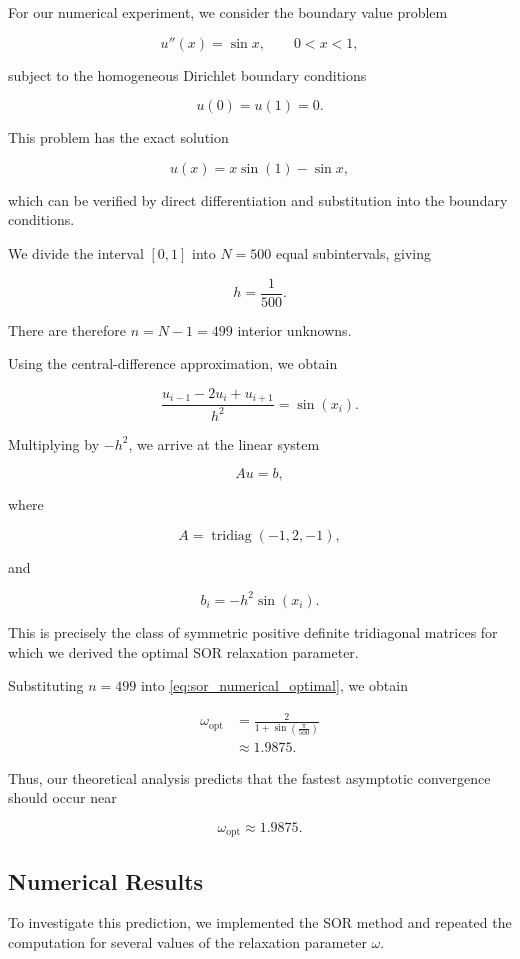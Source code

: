 \documentclass[11pt,a4paper]{article}
\theoremstyle{definition}
\theoremstyle{remark}
\begin{document}
For our numerical experiment, we consider
the boundary value problem

\[
    u''(x)=\sin x,
    \qquad 0<x<1,
\]

subject to the homogeneous Dirichlet
boundary conditions

\[
    u(0)=u(1)=0.
\]

This problem has the exact solution

\[
    u(x)=x\sin(1)-\sin x,
\]

which can be verified by direct
differentiation and substitution into
the boundary conditions.

We divide the interval $[0,1]$ into
$N=500$ equal subintervals, giving

\[
    h=\frac{1}{500}.
\]

There are therefore $n=N-1=499$
interior unknowns.

Using the central-difference
approximation, we obtain

\[
    \frac{
    u_{i-1}-2u_i+u_{i+1}
    }{h^2}
    =
    \sin(x_i).
\]

Multiplying by $-h^2$, we arrive at
the linear system

\[
    Au=b,
\]

where

\[
    A=\operatorname{tridiag}(-1,2,-1),
\]

and

\[
    b_i=-h^2\sin(x_i).
\]

This is precisely the class of symmetric
positive definite tridiagonal matrices
for which we derived the optimal SOR
relaxation parameter.

Substituting $n=499$ into
\eqref{eq:sor_numerical_optimal}, we obtain

\[
\begin{aligned}
    \omega_{\mathrm{opt}}
    &=
    \frac{2}{
    1+\sin\left(\frac{\pi}{500}\right)
    }\\[6pt]
    &\approx 1.9875.
\end{aligned}
\]

Thus, our theoretical analysis predicts
that the fastest asymptotic convergence
should occur near

\[
    \boxed{\omega_{\mathrm{opt}}\approx1.9875.}
\]

\subsection{Numerical Results}

To investigate this prediction, we
implemented the SOR method and repeated
the computation for several values
of the relaxation parameter $\omega$.
\end{document}
